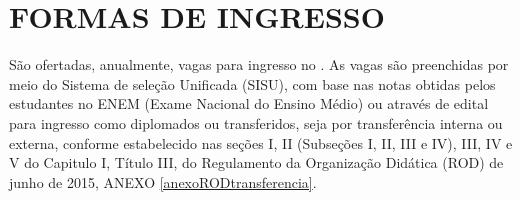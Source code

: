 \clearpage \section{FORMAS DE INGRESSO}
São ofertadas, anualmente, \NUMVAGAS vagas para ingresso no \NOMECURSO. As vagas são preenchidas por meio do Sistema de seleção Unificada (SISU), com base nas notas obtidas pelos estudantes no ENEM (Exame Nacional do Ensino Médio) ou através de edital para ingresso como diplomados ou transferidos, seja por transferência interna ou externa, conforme estabelecido nas seções I, II (Subseções I, II, III e IV), III, IV e V do Capitulo I, Título III, do Regulamento da Organização Didática (ROD) de junho de 2015, ANEXO \ref{anexoRODtransferencia}.